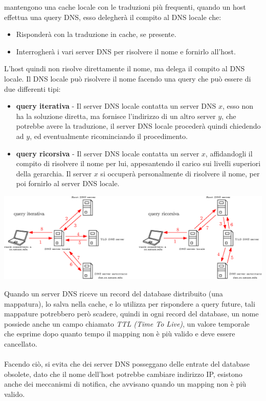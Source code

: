 \documentclass[12pt, letterpaper]{article}
\newcommand{\acc}{\\\hphantom{}\\}
\begin{document}
mantengono una cache locale con le traduzioni più frequenti, quando un host effettua una query DNS, esso
delegherà il compito al DNS locale che:\begin{itemize}
    \item Risponderà con la traduzione in cache, se presente.
    \item Interrogherà i vari server DNS per risolvere il nome e fornirlo all'host.
\end{itemize}
L'host quindi non risolve direttamente il nome, ma delega il compito al DNS locale. Il DNS locale può
risolvere il nome facendo una query che può essere di due differenti tipi:\begin{itemize}
    \item \textbf{query iterativa} - Il server DNS locale contatta un server DNS $x$, esso non ha
          la soluzione diretta, ma fornisce l'indirizzo di un altro server $y$, che potrebbe avere la
          traduzione, il server DNS locale procederà quindi chiedendo ad $y$, ed eventualmente ricominciando il
          procedimento.
    \item \textbf{query ricorsiva} - Il server DNS locale contatta un server $x$, affidandogli il
          compito di risolvere il nome per lui, appesantendo il carico sui livelli superiori della gerarchia. Il
          server $x$ si occuperà personalmente di risolvere il nome, per poi fornirlo al server DNS locale.
\end{itemize}\begin{center}
    \includegraphics[width=1\textwidth ]{images/risoluzioneDNS.eps}
\end{center}
Quando un server DNS riceve un record del database distribuito (una mappatura), lo salva nella cache,
e lo utilizza per rispondere a query future, tali mappature potrebbero però scadere, quindi in ogni record del
database, un nome possiede anche un campo chiamato \textit{TTL (Time To Live)}, un valore temporale che
esprime dopo quanto tempo il mapping non è più valido e deve essere cancellato.\acc Facendo ciò, si evita che
dei server DNS posseggano delle entrate del database obsolete, dato che il nome dell'host potrebbe
cambiare indirizzo IP, esistono anche dei meccanismi di notifica, che avvisano quando un mapping non è
più valido.
\end{document}
